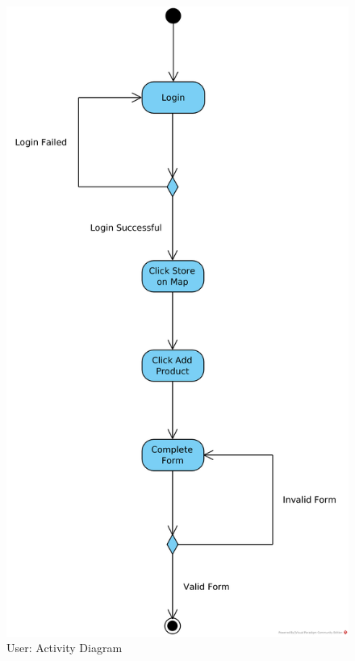 \begin{figure}[H]
    \centering
    \includegraphics[]{media/Activity/User.png}
	\caption{User: Activity Diagram}
	\label{fig:User_Activity}
\end{figure}



